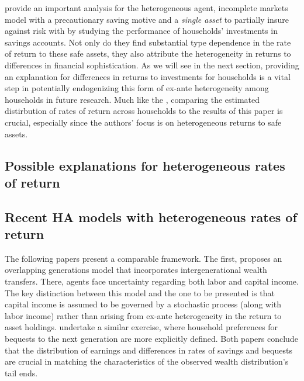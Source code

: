 \documentclass[\econtexRoot/Chp1]{subfiles}
\begin{document}
\par \cite{Deuflhard2018} provide an important analysis for the heterogeneous agent, incomplete markets model with a precautionary saving motive and a \textit{single asset} to partially insure against risk with by studying the performance of households' investments in savings accounts. Not only do they find substantial type dependence in the rate of return to these safe assets, they also attribute the heterogeneity in returns to differences in financial sophistication. As we will see in the next section, providing an explanation for differences in returns to investments for households is a vital step in potentially endogenizing this form of ex-ante heterogeneity among households in future research. Much like the \cite{aflgdmlp20}, comparing the estimated distirbution of rates of return across households to the results of this paper is crucial, especially since the authors' focus is on heterogeneous returns to  safe assets.

\subsection{Possible explanations for heterogeneous rates of return}

\par

\par

\par

\par

\par

\par 

\subsection{Recent HA models with heterogeneous rates of return}

\par The following papers present a comparable framework. The first, \cite{jbabsz11} proposes an overlapping generations model that incorporates intergenerational wealth transfers. There, agents face uncertainty regarding both labor and capital income. The key distinction between this model and the one to be presented is that capital income is assumed to be governed by a stochastic process (along with labor income) rather than arising from ex-ante heterogeneity in the return to asset holdings. \cite{jbabml17} undertake a similar exercise, where household preferences for bequests to the next generation are more explicitly defined. Both papers conclude that the distribution of earnings and differences in rates of savings and bequests are crucial in matching the characteristics of the observed wealth distribution's tail ends.
\end{document}
